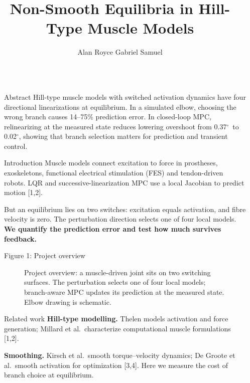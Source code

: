 \documentclass[final]{beamer}
\title{Non-Smooth Equilibria in Hill-Type Muscle Models}
\author{Alan Royce Gabriel Samuel}
\institute{Indian Institute of Technology Madras, Chennai, India}
\newlength{\sepwidth}
\newlength{\colwidth}
\newcommand{\separatorcolumn}{\begin{column}{\sepwidth}
\end{column}}
\newcommand{\chip}[1]{%
  \tikz[baseline=(n.base)]{\node[fill=accent,text=white,rounded corners=1.2mm,
    inner xsep=2.4mm,inner ysep=1.0mm,font=\bfseries](n){#1};}\hspace{0.6ex}}
\newcommand{\dg}{$^\circ$}
\begin{document}
\setlength{\abovedisplayskip}{0.5ex}
\setlength{\belowdisplayskip}{0.5ex}
\setlength{\abovedisplayshortskip}{0.5ex}
\setlength{\belowdisplayshortskip}{0.5ex}
\begin{frame}[t]
\begin{columns}[t]
\separatorcolumn
\begin{column}{\colwidth}
\begin{block}{\chip{1} Abstract}
Hill-type muscle models with switched activation dynamics have four directional
linearizations at equilibrium. In a simulated elbow, choosing the wrong branch
causes 14--75\% prediction error. In closed-loop MPC, relinearizing at the
measured state reduces lowering overshoot from 0.37\dg\ to 0.02\dg, showing
that branch selection matters for prediction and transient control.
\end{block}

\begin{block}{\chip{2} Introduction}
Muscle models connect excitation to force in prostheses, exoskeletons,
functional electrical stimulation (FES) and tendon-driven robots. LQR and
successive-linearization MPC use a local Jacobian to predict motion [1,2].

But an equilibrium lies on two switches: excitation equals activation, and
fibre velocity is zero. The perturbation direction selects one of four local
models. \textbf{We quantify the prediction error and test how much survives feedback.}
\end{block}

\begin{block}{Figure 1: Project overview}
\begin{figure}
\centering

\caption{Project overview: a muscle-driven joint sits on two switching surfaces.
The perturbation selects one of four local models; branch-aware MPC updates
its prediction at the measured state. Elbow drawing is schematic.}
\end{figure}
\end{block}

\begin{block}{\chip{3} Related work}
\textbf{Hill-type modelling.} Thelen models activation and force generation;
Millard et al.\ characterize computational muscle formulations [1,2].

\textbf{Smoothing.} Kirsch et al.\ smooth torque--velocity dynamics; De Groote
et al.\ smooth activation for optimization [3,4]. Here we measure the cost of
branch choice at equilibrium.


\end{block}
\end{column}
\end{columns}
\end{frame}
\end{document}
